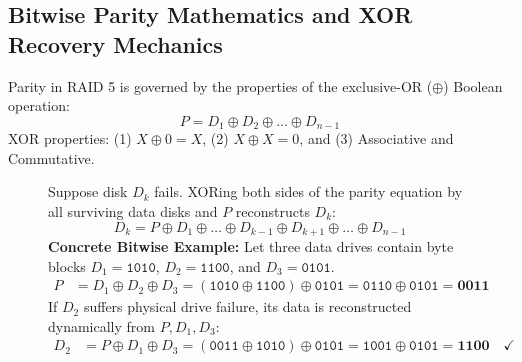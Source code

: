 \subsection{Bitwise Parity Mathematics and XOR Recovery Mechanics}
Parity in RAID 5 is governed by the properties of the exclusive-OR ($\oplus$) Boolean operation:
\begin{equation}
P = D_1 \oplus D_2 \oplus \dots \oplus D_{n-1}
\end{equation}
XOR properties: (1) $X \oplus 0 = X$, (2) $X \oplus X = 0$, and (3) Associative and Commutative.
\begin{figure}[htbp]
\centering
\begin{tcolorbox}[colback=codebg, colframe=primary, title=\textbf{Mathematical Proof of Parity Reconstruction}]
Suppose disk $D_k$ fails. XORing both sides of the parity equation by all surviving data disks and $P$ reconstructs $D_k$:
\begin{equation}
D_k = P \oplus D_1 \oplus \dots \oplus D_{k-1} \oplus D_{k+1} \oplus \dots \oplus D_{n-1}
\end{equation}
\textbf{Concrete Bitwise Example:}
Let three data drives contain byte blocks $D_1 = \texttt{1010}$, $D_2 = \texttt{1100}$, and $D_3 = \texttt{0101}$.
\begin{align*}
P &= D_1 \oplus D_2 \oplus D_3 = (\texttt{1010} \oplus \texttt{1100}) \oplus \texttt{0101} = \texttt{0110} \oplus \texttt{0101} = \mathbf{0011}
\end{align*}
If $D_2$ suffers physical drive failure, its data is reconstructed dynamically from $P, D_1, D_3$:
\begin{align*}
D_2 &= P \oplus D_1 \oplus D_3 = (\texttt{0011} \oplus \texttt{1010}) \oplus \texttt{0101} = \texttt{1001} \oplus \texttt{0101} = \mathbf{1100} \quad \checkmark
\end{align*}
\end{tcolorbox}
\end{figure}

